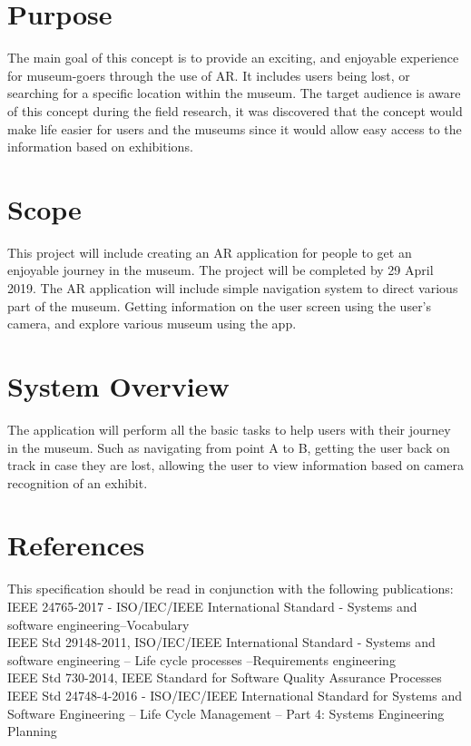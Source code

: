 
\section{Purpose}
The main goal of this concept is to provide an exciting, and enjoyable experience for museum-goers through the use of AR. It includes users being lost, or searching for a specific location within the museum. The target audience is aware of this concept during the field research, it was discovered that the concept would make life easier for users and the museums since it would allow easy access to the information based on exhibitions.

\section{Scope}
This project will include creating an AR application for people to get an enjoyable journey in the museum. The project will be completed by 29 April 2019. The AR application will include simple navigation system to direct various part of the museum. Getting information on the user screen using the user's camera, and explore various museum using the app. 

\section{System Overview}
The application will perform all the basic tasks to help users with their journey in the museum. Such as navigating from point A to B, getting the user back on track in case they are lost, allowing the user to view information based on camera recognition of an exhibit.

\newpage
\section{References}
This specification should be read in conjunction with the following publications:\\
IEEE 24765-2017 - ISO/IEC/IEEE International Standard - Systems and software engineering--Vocabulary \cite{IEEE24765}\\
IEEE Std 29148-2011, ISO/IEC/IEEE International Standard - Systems and software engineering -- Life cycle processes --Requirements engineering \cite{IEEE29148} \\
IEEE Std 730-2014, IEEE Standard for Software Quality Assurance Processes \cite{IEEE730} \\
IEEE Std 24748-4-2016 - ISO/IEC/IEEE International Standard for Systems and Software Engineering -- Life Cycle Management -- Part 4: Systems Engineering Planning \cite{IEEE24748}


